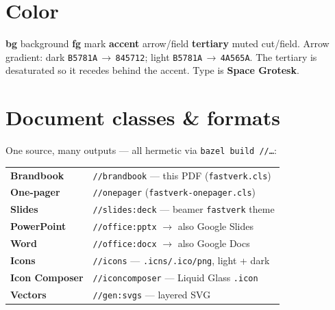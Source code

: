 \documentclass{fastverk}
\begin{document}
\section*{Color}
\quad
{}\quad
{}\quad
{}

\medskip
\noindent\textbf{bg} background \quad \textbf{fg} mark \quad
\textbf{accent} arrow/field \quad \textbf{tertiary} muted cut/field.
Arrow gradient: dark \texttt{B5781A}\,$\to$\,\texttt{845712}; light
\texttt{B5781A}\,$\to$\,\texttt{4A565A}. The tertiary is desaturated so it
recedes behind the accent. Type is \textbf{Space Grotesk}.

\section*{Document classes \& formats}
One source, many outputs — all hermetic via \texttt{bazel build //\dots}:

\begin{center}
\begin{tabular}{ll}
  \textbf{Brandbook} & \texttt{//brandbook} — this PDF (\texttt{fastverk.cls}) \\
  \textbf{One-pager} & \texttt{//onepager} (\texttt{fastverk-onepager.cls}) \\
  \textbf{Slides} & \texttt{//slides:deck} — beamer \texttt{fastverk} theme \\
  \textbf{PowerPoint} & \texttt{//office:pptx} \(\to\) also Google Slides \\
  \textbf{Word} & \texttt{//office:docx} \(\to\) also Google Docs \\
  \textbf{Icons} & \texttt{//icons} — \texttt{.icns/.ico/png}, light + dark \\
  \textbf{Icon Composer} & \texttt{//iconcomposer} — Liquid Glass \texttt{.icon} \\
  \textbf{Vectors} & \texttt{//gen:svgs} — layered SVG \\
\end{tabular}
\end{center}
\end{document}
